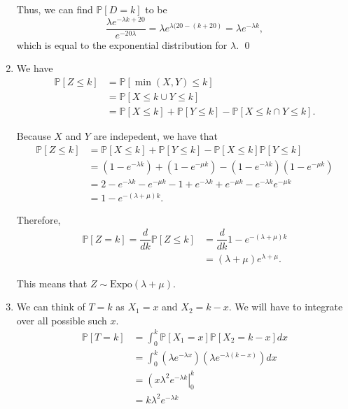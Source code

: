 \documentclass{article}
\newcommand{\p}{\mathbb{P}}
\begin{document}
\begin{enumerate}[label=(\alph*)]
Thus, we can find $\p[D = k]$ to be 
\[\dfrac{\lambda e^{-\lambda k + 20}}{e^{-20\lambda}} = \lambda e^{\lambda(20-(k+20)} = \boxed{\lambda e^{-\lambda k}}, \]
which is equal to the exponential distribution for $\lambda$. \qed

\item We have
\begin{align*}
\p[Z \leq k] &= \p[\min(X, Y) \leq k] \\
&= \p[X \leq k \cup Y \leq k] \\
&= \p[X \leq k] + \p[Y \leq k] - \p[X \leq k \cap Y \leq k].
\end{align*}

Because $X$ and $Y$ are indepedent, we have that
\begin{align*}
\p[Z \leq k] &= \p[X \leq k] + \p[Y \leq k] - \p[X \leq k] \p[Y \leq k] \\
&= (1 - e^{-\lambda k}) + (1 - e^{-\mu k}) - (1 - e^{-\lambda k})(1 - e^{-\mu k}) \\
&= 2 - e^{-\lambda k} - e^{-\mu k} - 1 + e^{-\lambda k} + e^{-\mu k} - e^{-\lambda k} e^{-\mu k} \\
&= 1 - e^{-(\lambda + \mu)k}.
\end{align*}

Therefore,
\begin{align*}
\p[Z = k] = \dfrac{d}{dk} \p[Z \leq k] &= \dfrac{d}{dk} 1 - e^{-(\lambda + \mu)k} \\ &= (\lambda + \mu) e^{\lambda + \mu}.
\end{align*}

This means that $\boxed{Z \sim \text{Expo}(\lambda + \mu).}$

\item We can think of $T = k$ as $X_1 = x$ and $X_2 = k-x$. We will have to integrate over all possible such $x$.
\begin{align*}
\p[T = k] &= \int_0^k \p[X_1 = x] \p[X_2 = k-x] dx \\
&= \int_0^k (\lambda e^{-\lambda x}) (\lambda e^{-\lambda(k-x)}) dx \\
&= \left(x\lambda^2 e^{-\lambda k} \right|_0^k \\
&= k\lambda^2 e^{-\lambda k}
\end{align*}
\end{enumerate}

\newpage
\end{document}
